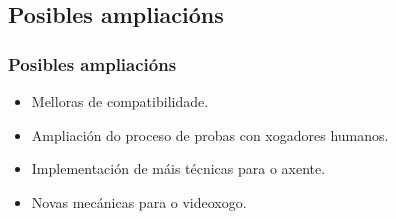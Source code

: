 \documentclass{beamer}
\begin{document}
\subsection{Posibles ampliacións}
\begin{frame}
\frametitle{Posibles ampliacións}
\begin{itemize}
	\item Melloras de compatibilidade.
	\item Ampliación do proceso de probas con xogadores humanos.
	\item Implementación de máis técnicas para o axente.
	\item Novas mecánicas para o videoxogo.
\end{itemize}

\end{frame}
\end{document}
